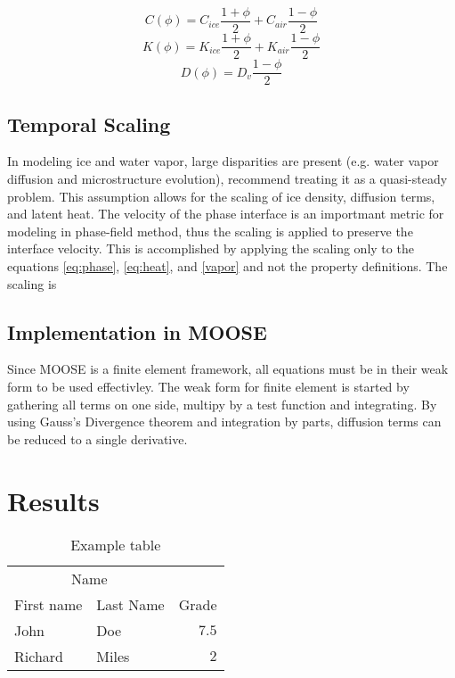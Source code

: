 \documentclass[twoside]{article}
\begin{document}
\begin{multicols}{2}
{\begin{equation} \label{eq:heat_capacity}
	C(\phi) = C_{ice} \frac{1+\phi}{2} + C_{air} \frac{1-\phi}{2}\end{equation} 
\begin{equation} \label{eq:conductivity}
	K(\phi) = K_{ice} \frac{1+\phi}{2} + K_{air} \frac{1-\phi}{2}
\end{equation} 
\begin{equation} \label{eq:diffusion_coefficient}
	D(\phi) = D_{v} \frac{1-\phi}{2}
\end{equation} 
\subsection{Temporal Scaling}
In modeling ice and water vapor, large disparities are present (e.g. water vapor diffusion and microstructure evolution), \cite{Plapp_2009} recommend treating it as a quasi-steady problem. This assumption allows for the scaling of ice density, diffusion terms, and latent heat. The velocity of the phase interface is an importmant metric for modeling in phase-field method, thus the scaling is applied to preserve the interface velocity. This is accomplished by applying the scaling only to the equations \eqref{eq:phase}, \eqref{eq:heat}, and \eqref{vapor} and not the property definitions. The scaling is  
\subsection{Implementation in MOOSE}
Since MOOSE is a finite element framework, all equations must be in their weak form to be used effectivley. The weak form for finite element is started by gathering all terms on one side, multipy by a test function and integrating.  By using Gauss's Divergence theorem and integration by parts, diffusion terms can be reduced to a single derivative.  




\section{Results}

\begin{table}[H]
\caption{Example table}
\centering
\begin{tabular}{llr}
\toprule
\multicolumn{2}{c}{Name} \\
\cmidrule(r){1-2}
First name & Last Name & Grade \\
\midrule
John & Doe & $7.5$ \\
Richard & Miles & $2$ \\
\bottomrule
\end{tabular}
\end{table}



}
\end{multicols}
\end{document}
